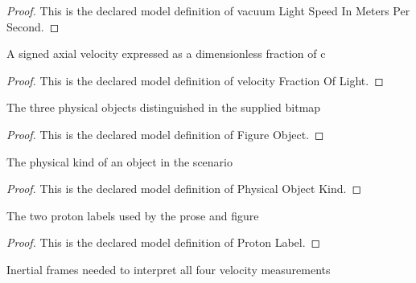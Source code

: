 \begin{proof}
  This is the declared model definition of vacuum Light Speed In Meters Per Second.
\end{proof}
\begin{definition}
  \label{def:physics:phyx-mini-0558:phyxminiproblems-problemphyxmini0558-velocityfractionoflight}
  A signed axial velocity expressed as a dimensionless fraction of c
\end{definition}
\begin{proof}
  This is the declared model definition of velocity Fraction Of Light.
\end{proof}
\begin{definition}
  \label{def:physics:phyx-mini-0558:phyxminiproblems-problemphyxmini0558-figureobject}
  The three physical objects distinguished in the supplied bitmap
\end{definition}
\begin{proof}
  This is the declared model definition of Figure Object.
\end{proof}
\begin{definition}
  \label{def:physics:phyx-mini-0558:phyxminiproblems-problemphyxmini0558-physicalobjectkind}
  The physical kind of an object in the scenario
\end{definition}
\begin{proof}
  This is the declared model definition of Physical Object Kind.
\end{proof}
\begin{definition}
  \label{def:physics:phyx-mini-0558:phyxminiproblems-problemphyxmini0558-protonlabel}
  The two proton labels used by the prose and figure
\end{definition}
\begin{proof}
  This is the declared model definition of Proton Label.
\end{proof}
\begin{definition}
  \label{def:physics:phyx-mini-0558:phyxminiproblems-problemphyxmini0558-inertialframelabel}
  Inertial frames needed to interpret all four velocity measurements
\end{definition}
